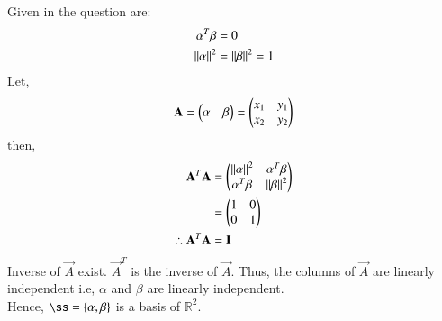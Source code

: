 \documentclass[journal,12pt,twocolumn]{IEEEtran}
\begin{document}
Given in the question are:
\begin{align}
\alpha^T\beta&=0\label{eq0}\\
\left\lVert\alpha\right\rVert^2 &=\left\lVert\beta\right\rVert^2=1 \label{eq1}
\end{align}
Let,
\begin{align}
 \mathbf{A}=\begin{pmatrix}\alpha & \beta\end{pmatrix}=\begin{pmatrix}x_1&y_1\\x_2&y_2\end{pmatrix}
\end{align}
then,
\begin{align}
 \mathbf{A}^T\mathbf{A}&=\begin{pmatrix}\left\lVert\alpha\right\rVert^2 &\alpha^T\beta\\\alpha^T\beta&\left\lVert\beta\right\rVert^2\end{pmatrix}\\ &=\begin{pmatrix}1&0\\0&1\end{pmatrix}\\
 \therefore \mathbf{A}^T\mathbf{A}&=\mathbf{I}
\end{align}
Inverse of $\vec{A}$ exist. $\vec{A}^T$ is the inverse of $\vec{A}$. 
Thus, the columns of $\vec{A}$ are linearly independent i.e, $\alpha$ and $\beta$ are linearly independent. \\
Hence, $\ss=\{\vec{\alpha},\vec{\beta}\}$ is a basis of $\mathbb{R}^2$.\\
\end{document}
